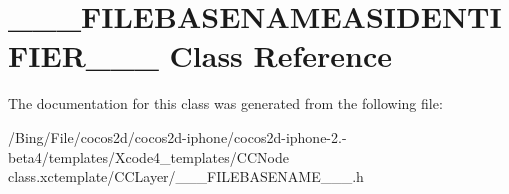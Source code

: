 \hypertarget{interface_______f_i_l_e_b_a_s_e_n_a_m_e_a_s_i_d_e_n_t_i_f_i_e_r______}{\section{\-\_\-\-\_\-\-\_\-\-F\-I\-L\-E\-B\-A\-S\-E\-N\-A\-M\-E\-A\-S\-I\-D\-E\-N\-T\-I\-F\-I\-E\-R\-\_\-\-\_\-\-\_\- Class Reference}
\label{interface_______f_i_l_e_b_a_s_e_n_a_m_e_a_s_i_d_e_n_t_i_f_i_e_r______}
}


The documentation for this class was generated from the following file\-:\begin{DoxyCompactItemize}
\item 
/\-Bing/\-File/cocos2d/cocos2d-\/iphone/cocos2d-\/iphone-\/2.-\/beta4/templates/\-Xcode4\-\_\-templates/\-C\-C\-Node class.\-xctemplate/\-C\-C\-Layer/\-\_\-\-\_\-\-\_\-\-F\-I\-L\-E\-B\-A\-S\-E\-N\-A\-M\-E\-\_\-\-\_\-\-\_\-.\-h\end{DoxyCompactItemize}
